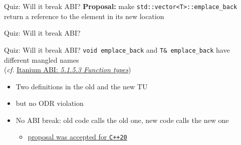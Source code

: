 \begin{frame}{Quiz: Will it break ABI?}
    \textbf{Proposal:} make \texttt{std::vector<T>::emplace\_back} return a reference to the element in its new location

    \vspace*{5mm}

    \centering


    \scalebox{2}{$\downarrow$}

\end{frame}

\begin{frame}[fragile]{Quiz: Will it break ABI?}
\end{frame}

\begin{frame}[fragile]{Quiz: Will it break ABI?}
    \texttt{void emplace\_back} and \texttt{T\& emplace\_back} have different mangled names\\
    (\textit{cf.} \href{https://itanium-cxx-abi.github.io/cxx-abi/abi.html#mangle.function-type}{Itanium ABI: \textit{5.1.5.3 Function types}})
    \begin{itemize}
        \item Two definitions in the old and the new TU
        \item but no ODR violation
        \item \textcolor{vertexDarkRed}{No ABI break:} old code calls the old one, new code calls the new one
        \begin{itemize}
            \item \href{https://en.cppreference.com/w/cpp/container/vector/emplace_back}{proposal was accepted for \texttt{C++20}}
        \end{itemize}
    \end{itemize}
\end{frame}

